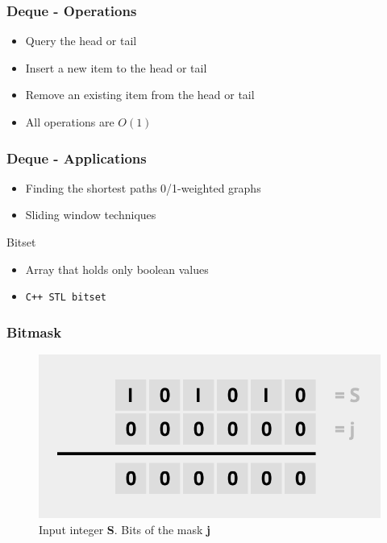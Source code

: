 \documentclass{beamer}
\begin{document}
\begin{frame}[fragile]
\frametitle{Deque - Operations}
	\begin{itemize}
		\item Query the head or tail
		\item Insert a new item to the head or tail
		\item Remove an existing item from the head or tail
		\item All operations are $O(1)$
	\end{itemize}
\end{frame}

\begin{frame}[fragile]
\frametitle{Deque - Applications}
	\begin{itemize}
		\item Finding the shortest paths 0/1-weighted graphs
		\item Sliding window techniques
	\end{itemize}
\end{frame}

\begin{frame}[fragile]{Bitset}
    \begin{itemize}
        \item Array that holds only boolean values
        \item \verb|C++ STL bitset|
    \end{itemize}
\end{frame}

\begin{frame}
\frametitle{Bitmask}
	\begin{figure}
		\centering
		\includegraphics[scale=0.5]{imgs/2-LDS/bitmask/bitmask-operations.png}
		\caption{Input integer \textbf{S}. Bits of the mask \textbf{j}}
	\end{figure}
\end{frame}
\end{document}
